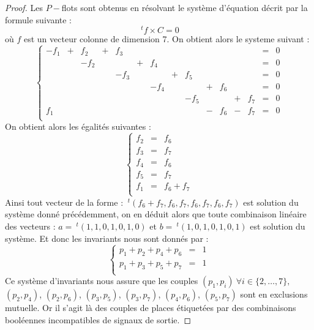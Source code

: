 \begin{proof}
    Les $P-$flots sont obtenus en résolvant le système d'équation décrit par la formule suivante : 
    \begin{displaymath}
        ~^tf \times C = 0
    \end{displaymath}
    où $f$ est un vecteur colonne de dimension 7. On obtient alors le systeme suivant :
    \begin{displaymath}
        \left \{ \begin{array}{ccccccccccccccl}
            -f_1 & + &  f_2 & + &  f_3 &   &      &   &      &   &      &   &      & = & 0\\
                 &   & -f_2 &   &      & + &  f_4 &   &      &   &      &   &      & = & 0\\
                 &   &      &   & -f_3 &   &      & + &  f_5 &   &      &   &      & = & 0\\
                 &   &      &   &      &   & -f_4 &   &      & + &  f_6 &   &      & = & 0\\
                 &   &      &   &      &   &      &   & -f_5 &   &      & + &  f_7 & = & 0\\
             f_1 &   &      &   &      &   &      &   &      & - &  f_6 & - &  f_7 & = & 0\\
        \end{array}
        \right .
    \end{displaymath}
    On obtient alors les égalités suivantes :
    \begin{displaymath}
        \left \{
        \begin{array}{rcl}
            f_2 & = & f_6 \\
            f_3 & = & f_7 \\
            f_4 & = & f_6 \\
            f_5 & = & f_7 \\
            f_1 & = & f_6 + f_7\\
        \end{array}
        \right .
    \end{displaymath}
    Ainsi tout vecteur de la forme : $~^t(f_6 + f_7, f_6, f_7, f_6, f_7, f_6, f_7)$ est solution du
    système donné précédemment, on en déduit alors que toute combinaison linéaire des vecteurs : $a
    = ~^t(1, 1, 0, 1, 0, 1, 0)$ et $b = ~^t(1, 0, 1, 0, 1, 0, 1)$ est solution du système. Et donc
    les invariants nous sont donnés par : \begin{displaymath}
        \left \{ \begin{array}{rcl}
            p_1 + p_2 + p_4 + p_6 & = & 1 \\
            p_1 + p_3 + p_5 + p_7 & = & 1 \\
        \end{array}
        \right .
    \end{displaymath}
    Ce système d'invariants nous assure que les couples $(p_1, p_i)\ \forall i \in \{2, \dots, 7\},$
    $(p_2, p_4)$, $(p_2, p_6)$, $(p_3, p_5)$, $(p_3, p_7)$, $(p_4, p_6)$, $(p_5, p_7)$ sont en exclusions
    mutuelle. Or il s'agit là des couples de places étiquetées par des combinaisons booléennes
    incompatibles de signaux de sortie.
\end{proof}


